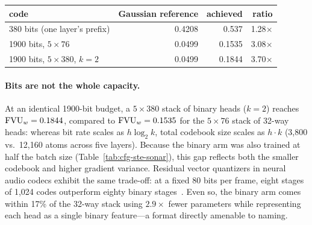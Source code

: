 \begin{center}\small
\begin{tabular}{@{}lrrr@{}}
\toprule
code & Gaussian reference & achieved & ratio \\
\midrule
380 bits (one layer's prefix) & 0.4208 & 0.537 & 1.28$\times$ \\
1900 bits, $5\times76$ & 0.0499 & 0.1535 & 3.08$\times$ \\
1900 bits, $5\times380$, $k{=}2$ & 0.0499 & 0.1844 & 3.70$\times$ \\
\bottomrule
\end{tabular}
\end{center}

\paragraph{Bits are not the whole capacity.} At an identical 1900-bit
budget, a $5\times380$ stack of binary heads ($k{=}2$) reaches $\mathrm{FVU}_w =
0.1844$, compared to $\mathrm{FVU}_w = 0.1535$ for the $5\times76$ stack of 32-way
heads: whereas bit rate scales as $h\log_2 k$, total codebook size scales
as $h\cdot k$ (3{,}800 vs.\ 12{,}160 atoms across five layers). Because
the binary arm was also trained at half the batch size
(Table~\ref{tab:cfg-ste-sonar}), this gap reflects both the smaller
codebook and higher gradient variance. Residual vector quantizers in
neural audio codecs exhibit the same trade-off: at a fixed 80 bits per
frame, eight stages of 1{,}024 codes outperform eighty binary
stages~\cite{zeghidour2021}. Even so, the binary arm comes within 17\% of
the 32-way stack using $2.9\times$ fewer parameters while representing
each head as a single binary feature---a format directly amenable to
naming.

